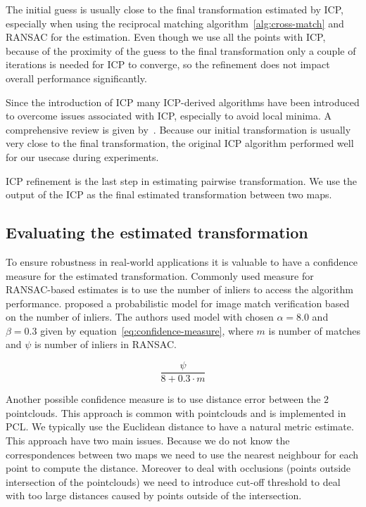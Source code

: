 The initial guess is usually close to the final transformation estimated by \gls{ICP}, especially when using the reciprocal matching algorithm~\ref{alg:cross-match} and \gls{RANSAC} for the estimation. Even though we use all the points with \gls{ICP}, because of the proximity of the guess to the final transformation only a couple of iterations is needed for \gls{ICP} to converge, so the refinement does not impact overall performance significantly.

Since the introduction of \gls{ICP} many \gls{ICP}-derived algorithms have been introduced to overcome issues associated with \gls{ICP}, especially to avoid local minima. A comprehensive review is given by~\citet{pomerleau2015reviewregistration}. Because our initial transformation is usually very close to the final transformation, the original \gls{ICP} algorithm performed well for our usecase during experiments.

\gls{ICP} refinement is the last step in estimating pairwise transformation. We use the output of the \gls{ICP} as the final estimated transformation between two maps.

\subsection{Evaluating the estimated transformation}
\label{sec:transform-evaluation}

To ensure robustness in real-world applications it is valuable to have a confidence measure for the estimated transformation. Commonly used measure for \gls{RANSAC}-based estimates is to use the number of inliers to access the algorithm performance. \citet{brown2007automatic} proposed a probabilistic model for image match verification based on the number of inliers. The authors used model with chosen $\alpha = 8.0$ and $\beta = 0.3$ given by equation~\eqref{eq:confidence-measure}, where $m$ is number of matches and $\psi$ is number of inliers in \gls{RANSAC}.

\begin{equation}
\label{eq:confidence-measure}
\frac{\psi}{8 + 0.3 \cdot m}
\end{equation}

Another possible confidence measure is to use distance error between the $2$ pointclouds. This approach is common with pointclouds and is implemented in \gls{PCL}. We typically use the Euclidean distance to have a natural metric estimate. This approach have two main issues. Because we do not know the correspondences between two maps we need to use the nearest neighbour for each point to compute the distance. Moreover to deal with occlusions (points outside intersection of the pointclouds) we need to introduce cut-off threshold to deal with too large distances caused by points outside of the intersection.

